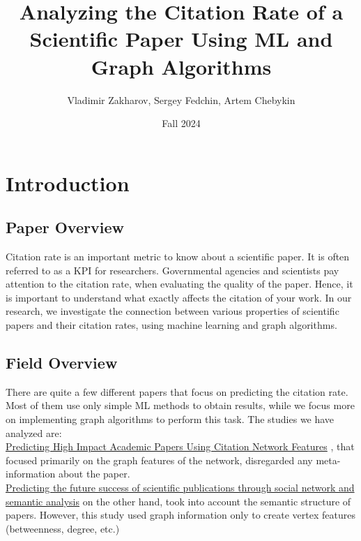 \documentclass{article}
\title{Analyzing the Citation Rate of a Scientific Paper Using ML and Graph Algorithms}
\author{Vladimir Zakharov, Sergey Fedchin, Artem Chebykin}
\date{Fall 2024}
\newcommand\tab[1][1cm]{\hspace*{#1}}
\begin{document}
\maketitle

\tableofcontents

\newpage
\section{Introduction}

\subsection{Paper Overview}

\tab Citation rate is an important metric to know about a scientific paper. It is often referred to as a KPI for researchers. Governmental agencies and scientists pay attention to the citation rate, when evaluating the quality of the paper. Hence, it is important to understand what exactly affects the citation of your work. In our research, we investigate the connection between various properties of scientific papers and their citation rates, using machine learning and graph algorithms. \\

\subsection{Field Overview}
\tab There are quite a few different papers that focus on predicting the citation rate. Most of them use only simple ML methods to obtain results, while we focus more on implementing graph algorithms to perform this task. The studies we have analyzed are: \\

\tab \href{https://link.springer.com/chapter/10.1007/978-3-642-40319-4_2?fromPaywallRec=false}{Predicting High Impact Academic Papers Using Citation Network Features} , that focused primarily on the graph features of the network, disregarded any meta-information about the paper.\\

\tab \href{https://link.springer.com/article/10.1007/s11192-020-03479-5?fromPaywallRec=true}{Predicting the future success of scientific publications through social network and semantic analysis} on the other hand, took into account the semantic structure of papers. However, this study used graph information only to create vertex features (betweenness, degree, etc.)\\
\end{document}
